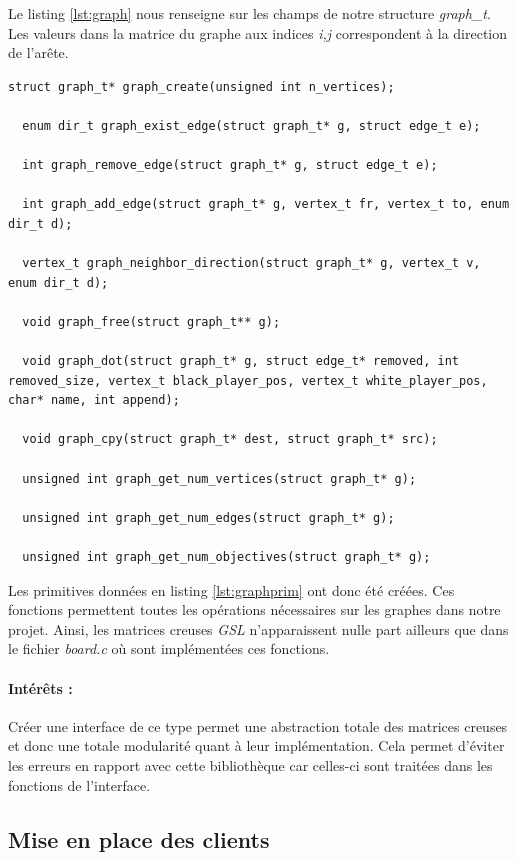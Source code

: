 Le listing \ref{lst:graph} nous renseigne sur les champs de notre structure \textit{graph\_t}.
Les valeurs dans la matrice du graphe aux indices \textit{i,j} correspondent à la direction de l'arête.

\begin{lstlisting}[style=customc, label={lst:graphprim}, caption={Primitives du type graph\_t}]
  struct graph_t* graph_create(unsigned int n_vertices);

  enum dir_t graph_exist_edge(struct graph_t* g, struct edge_t e);

  int graph_remove_edge(struct graph_t* g, struct edge_t e);

  int graph_add_edge(struct graph_t* g, vertex_t fr, vertex_t to, enum dir_t d);

  vertex_t graph_neighbor_direction(struct graph_t* g, vertex_t v, enum dir_t d);

  void graph_free(struct graph_t** g);

  void graph_dot(struct graph_t* g, struct edge_t* removed, int removed_size, vertex_t black_player_pos, vertex_t white_player_pos, char* name, int append);

  void graph_cpy(struct graph_t* dest, struct graph_t* src);

  unsigned int graph_get_num_vertices(struct graph_t* g);

  unsigned int graph_get_num_edges(struct graph_t* g);

  unsigned int graph_get_num_objectives(struct graph_t* g);
\end{lstlisting}

Les primitives données en listing \ref{lst:graphprim} ont donc été créées.
Ces fonctions permettent toutes les opérations nécessaires sur les graphes dans notre projet.
Ainsi, les matrices creuses \textit{GSL} n'apparaissent nulle part ailleurs que dans le fichier \textit{board.c} où sont implémentées ces fonctions.

\paragraph{Intérêts : }
Créer une interface de ce type permet une abstraction totale des matrices creuses et donc une totale modularité quant à leur implémentation.
Cela permet d'éviter les erreurs en rapport avec cette bibliothèque car celles-ci sont traitées dans les fonctions de l'interface.

\subsection{Mise en place des clients}

